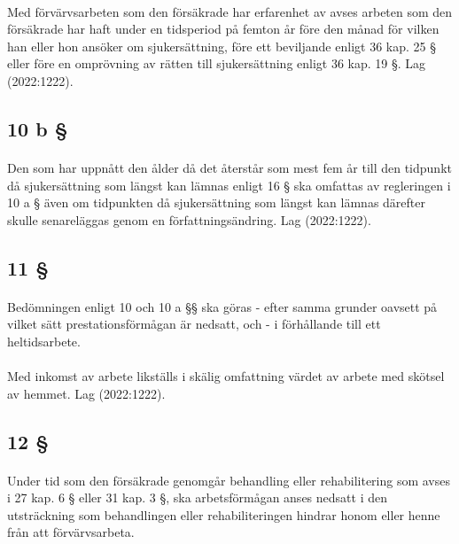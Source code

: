 \documentclass[a4paper,notitlepage,openany,10pt]{book}
\begin{document}
\paragraph*{}
Med förvärvsarbeten som den försäkrade har erfarenhet av avses arbeten som den försäkrade har haft under en tidsperiod på femton år före den månad för vilken han eller hon ansöker om sjukersättning, före ett beviljande enligt 36 kap. 25 § eller före en omprövning av rätten till sjukersättning enligt 36 kap. 19 §.
Lag (2022:1222).
\subsection*{10 b §}
\paragraph*{}
Den som har uppnått den ålder då det återstår som mest fem år till den tidpunkt då sjukersättning som längst kan lämnas enligt 16 § ska omfattas av regleringen i 10 a § även om tidpunkten då sjukersättning som längst kan lämnas därefter skulle senareläggas genom en författningsändring.
Lag (2022:1222).
\subsection*{11 §}
\paragraph*{}
Bedömningen enligt 10 och 10 a §§ ska göras
\newline - efter samma grunder oavsett på vilket sätt prestationsförmågan är nedsatt, och
\newline - i förhållande till ett heltidsarbete.
\paragraph*{}
Med inkomst av arbete likställs i skälig omfattning värdet av arbete med skötsel av hemmet.
Lag (2022:1222).
\subsection*{12 §}
\paragraph*{}
Under tid som den försäkrade genomgår behandling eller rehabilitering som avses i 27 kap. 6 § eller 31 kap. 3 §, ska arbetsförmågan anses nedsatt i den utsträckning som behandlingen eller rehabiliteringen hindrar honom eller henne från att förvärvsarbeta.
\end{document}
